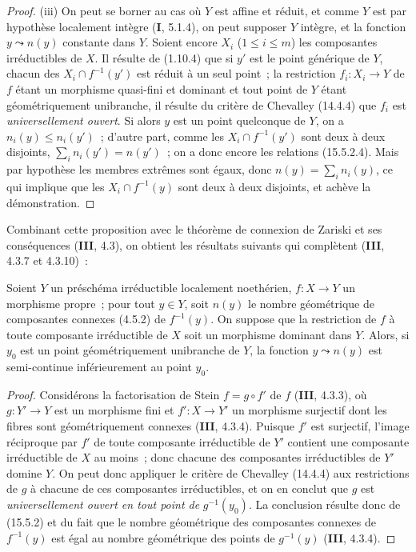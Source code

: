 \begin{proof}
(iii) On peut se borner au cas où $Y$ est affine et réduit, et comme $Y$ est par hypothèse localement intègre (\textbf{I}, 5.1.4), on peut supposer $Y$ intègre, et la fonction $y\leadsto n(y)$ constante dans $Y$. Soient encore $X_i$ ($1\leqslant i\leqslant m$) les composantes irréductibles de $X$. Il résulte de (1.10.4) que si $y'$ est le point générique de $Y$, chacun des $X_i\cap f^{-1}(y')$ est réduit à un seul point~; la restriction $f_i:X_i\to Y$ de $f$ étant un morphisme quasi-fini et dominant et tout point de $Y$ étant géométriquement unibranche, il résulte du critère de Chevalley (14.4.4) que $f_i$ est \emph{universellement ouvert}. Si alors $y$ est un point quelconque de $Y$, on a $n_i(y)\leqslant n_i(y')$~; d'autre part, comme les $X_i\cap f^{-1}(y')$ sont deux à deux disjoints, $\sum_i n_i(y')=n(y')$~; on a donc encore les relations (15.5.2.4). Mais par hypothèse les membres extrêmes sont égaux, donc $n(y)=\sum_i n_i(y)$, ce qui implique que les $X_i\cap f^{-1}(y)$ sont deux à deux disjoints, et achève la démonstration.
\end{proof}

Combinant cette proposition avec le théorème de connexion de Zariski et ses conséquences (\textbf{III}, 4.3), on obtient les résultats suivants qui complètent (\textbf{III}, 4.3.7 et 4.3.10)~:

\begin{proposition}[15.5.3]
\label{IV.15.5.3-fr}
Soient $Y$ un préschéma irréductible localement noethérien, $f:X\to Y$ un morphisme propre~; pour tout $y\in Y$, soit $n(y)$ le nombre géométrique de composantes connexes \textup{(4.5.2)} de $f^{-1}(y)$. On suppose que la restriction de $f$ à toute composante irréductible de $X$ soit un morphisme dominant dans $Y$. Alors, si $y_0$ est un point géométriquement unibranche de $Y$, la fonction $y\leadsto n(y)$ est semi-continue inférieurement au point $y_0$.
\end{proposition}

\begin{proof}
Considérons la factorisation de Stein $f=g\circ f'$ de $f$ (\textbf{III}, 4.3.3), où $g:Y'\to Y$ est un morphisme fini et $f':X\to Y'$ un morphisme surjectif dont les fibres sont géométriquement connexes (\textbf{III}, 4.3.4). Puisque $f'$ est surjectif, l'image réciproque par $f'$ de toute composante irréductible de $Y'$ contient une composante irréductible de $X$ au moins~; donc chacune des composantes irréductibles de $Y'$ domine $Y$. On peut donc appliquer le critère de Chevalley (14.4.4) aux restrictions de $g$ à chacune de ces composantes irréductibles, et on en conclut que $g$ est \emph{universellement ouvert en tout point de} $g^{-1}(y_0)$. La conclusion résulte donc de (15.5.2) et du fait que le nombre géométrique des composantes connexes de $f^{-1}(y)$ est égal au nombre géométrique des points de $g^{-1}(y)$ (\textbf{III}, 4.3.4).
\end{proof}

